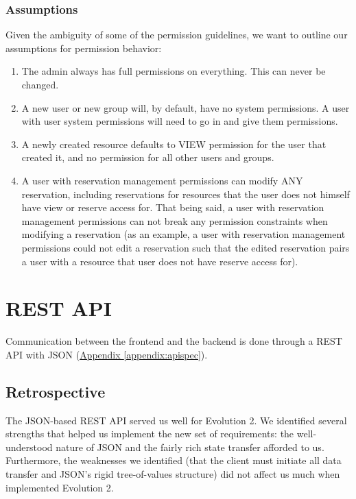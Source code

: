 \documentclass[12pt]{article}
\begin{document}
\subsubsection{Assumptions}
Given the ambiguity of some of the permission guidelines, we want to outline our assumptions for permission behavior:
\begin{enumerate}
    \item The admin always has full permissions on everything. This can never be changed. 
    \item A new user or new group will, by default, have no system permissions. A user with user system permissions will need to go in and give them permissions. 
    \item A newly created resource defaults to VIEW permission for the user that created it, and no permission for all other users and groups. 
    \item A user with reservation management permissions can modify ANY reservation, including reservations for resources that the user does not himself have view or reserve access for. That being said, a user with reservation management permissions can not break any permission constraints when modifying a reservation (as an example, a user with reservation management permissions could not edit a reservation such that the edited reservation pairs a user with a resource that user does not have reserve access for). 
\end{enumerate}



\section{REST API}
\label{sec:REST}
Communication between the frontend and the backend is done through a REST API with JSON (\hyperref[appendix:apispec]{Appendix \ref{appendix:apispec}}).

\subsection{Retrospective}
The JSON-based REST API served us well for Evolution 2. We identified several strengths that helped us implement the new set of requirements: the well-understood nature of JSON and the fairly rich state transfer afforded to us. Furthermore, the weaknesses we identified (that the client must initiate all data transfer and JSON's rigid tree-of-values structure) did not affect us much when implemented Evolution 2.
\end{document}
